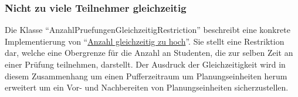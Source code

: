 \subsubsection{Nicht zu viele Teilnehmer gleichzeitig}\label{subsubsec:nicht-zu-viele-teilnehmer-gleichzeitig}
Die Klasse \enquote{AnzahlPruefungenGleichzeitigRestriction} beschreibt eine konkrete Implementierung von
\enquote{\hyperref[subsubsec:anzahl-gleichzeitig-zu-hoch]{Anzahl gleichzeitig zu hoch}}.
Sie stellt eine Restriktion dar, welche eine Obergrenze für die Anzahl an Studenten,
die zur selben Zeit an einer Prüfung teilnehmen, darstellt.
Der Ausdruck der Gleichzeitigkeit wird in diesem Zusammenhang um einen Pufferzeitraum
um Planungseinheiten herum erweitert um ein Vor- und Nachbereiten von Planungseinheiten sicherzustellen.
